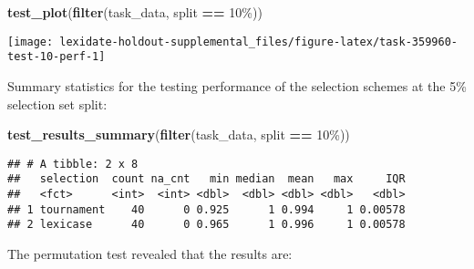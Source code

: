 \documentclass[
]{book}
\newenvironment{Shaded}{\begin{snugshade}}{\end{snugshade}}
\newcommand{\AttributeTok}[1]{\textcolor[rgb]{0.13,0.29,0.53}{#1}}
\newcommand{\DecValTok}[1]{\textcolor[rgb]{0.00,0.00,0.81}{#1}}
\newcommand{\FunctionTok}[1]{\textcolor[rgb]{0.13,0.29,0.53}{\textbf{#1}}}
\newcommand{\NormalTok}[1]{#1}
\newcommand{\OtherTok}[1]{\textcolor[rgb]{0.56,0.35,0.01}{#1}}
\newcommand{\SpecialCharTok}[1]{\textcolor[rgb]{0.81,0.36,0.00}{\textbf{#1}}}
\newcommand{\StringTok}[1]{\textcolor[rgb]{0.31,0.60,0.02}{#1}}
\begin{document}
\begin{Shaded}
\begin{Highlighting}[]
\FunctionTok{test\_plot}\NormalTok{(}\FunctionTok{filter}\NormalTok{(task\_data, split }\SpecialCharTok{==} \StringTok{\textquotesingle{}10\%\textquotesingle{}}\NormalTok{))}
\end{Highlighting}
\end{Shaded}

\texttt{[image: lexidate-holdout-supplemental\_files/figure-latex/task-359960-test-10-perf-1]}

Summary statistics for the testing performance of the selection schemes at the 5\% selection set split:

\begin{Shaded}
\begin{Highlighting}[]
\FunctionTok{test\_results\_summary}\NormalTok{(}\FunctionTok{filter}\NormalTok{(task\_data, split }\SpecialCharTok{==} \StringTok{\textquotesingle{}10\%\textquotesingle{}}\NormalTok{))}
\end{Highlighting}
\end{Shaded}

\begin{verbatim}
## # A tibble: 2 x 8
##   selection  count na_cnt   min median  mean   max     IQR
##   <fct>      <int>  <int> <dbl>  <dbl> <dbl> <dbl>   <dbl>
## 1 tournament    40      0 0.925      1 0.994     1 0.00578
## 2 lexicase      40      0 0.965      1 0.996     1 0.00578
\end{verbatim}

The permutation test revealed that the results are:

\begin{Shaded}
\end{Shaded}
\end{document}
